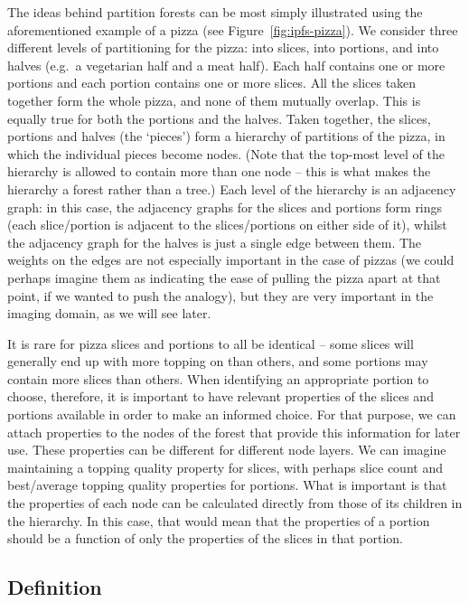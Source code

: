 The ideas behind partition forests can be most simply illustrated using the aforementioned example of a pizza (see Figure~\ref{fig:ipfs-pizza}). We consider three different levels of partitioning for the pizza: into slices, into portions, and into halves (e.g.~a vegetarian half and a meat half). Each half contains one or more portions and each portion contains one or more slices. All the slices taken together form the whole pizza, and none of them mutually overlap. This is equally true for both the portions and the halves. Taken together, the slices, portions and halves (the `pieces') form a hierarchy of partitions of the pizza, in which the individual pieces become nodes. (Note that the top-most level of the hierarchy is allowed to contain more than one node -- this is what makes the hierarchy a forest rather than a tree.) Each level of the hierarchy is an adjacency graph: in this case, the adjacency graphs for the slices and portions form rings (each slice/portion is adjacent to the slices/portions on either side of it), whilst the adjacency graph for the halves is just a single edge between them. The weights on the edges are not especially important in the case of pizzas (we could perhaps imagine them as indicating the ease of pulling the pizza apart at that point, if we wanted to push the analogy), but they are very important in the imaging domain, as we will see later.


It is rare for pizza slices and portions to all be identical -- some slices will generally end up with more topping on than others, and some portions may contain more slices than others. When identifying an appropriate portion to choose, therefore, it is important to have relevant properties of the slices and portions available in order to make an informed choice. For that purpose, we can attach properties to the nodes of the forest that provide this information for later use. These properties can be different for different node layers. We can imagine maintaining a topping quality property for slices, with perhaps slice count and best/average topping quality properties for portions. What is important is that the properties of each node can be calculated directly from those of its children in the hierarchy. In this case, that would mean that the properties of a portion should be a function of only the properties of the slices in that portion.

\subsection{Definition}

